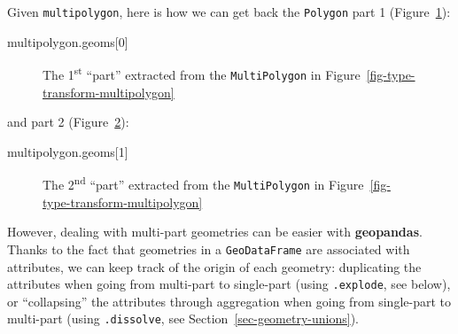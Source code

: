 \documentclass[
  letterpaper,
]{krantz}
\newenvironment{Shaded}{\begin{snugshade}}{\end{snugshade}}
\newcommand{\DecValTok}[1]{\textcolor[rgb]{0.68,0.00,0.00}{#1}}
\newcommand{\NormalTok}[1]{\textcolor[rgb]{0.00,0.23,0.31}{#1}}
\begin{document}
Given \texttt{multipolygon}, here is how we can get back the
\texttt{\textquotesingle{}Polygon\textquotesingle{}} part 1
(Figure~\ref{fig-type-transform-multipolygon1}):

\begin{Shaded}
\begin{Highlighting}[]
\NormalTok{multipolygon.geoms[}\DecValTok{0}\NormalTok{]}
\end{Highlighting}
\end{Shaded}

\begin{figure}[H]


\caption{\label{fig-type-transform-multipolygon1}The
1\textsuperscript{st} ``part'' extracted from the
\texttt{\textquotesingle{}MultiPolygon\textquotesingle{}} in
Figure~\ref{fig-type-transform-multipolygon}}

\end{figure}%

and part 2 (Figure~\ref{fig-type-transform-multipolygon2}):

\begin{Shaded}
\begin{Highlighting}[]
\NormalTok{multipolygon.geoms[}\DecValTok{1}\NormalTok{]}
\end{Highlighting}
\end{Shaded}

\begin{figure}[H]


\caption{\label{fig-type-transform-multipolygon2}The
2\textsuperscript{nd} ``part'' extracted from the
\texttt{\textquotesingle{}MultiPolygon\textquotesingle{}} in
Figure~\ref{fig-type-transform-multipolygon}}

\end{figure}%

However, dealing with multi-part geometries can be easier with
\textbf{geopandas}. Thanks to the fact that geometries in a
\texttt{GeoDataFrame} are associated with attributes, we can keep track
of the origin of each geometry: duplicating the attributes when going
from multi-part to single-part (using \texttt{.explode}, see below), or
``collapsing'' the attributes through aggregation when going from
single-part to multi-part (using \texttt{.dissolve}, see
Section~\ref{sec-geometry-unions}).
\end{document}
